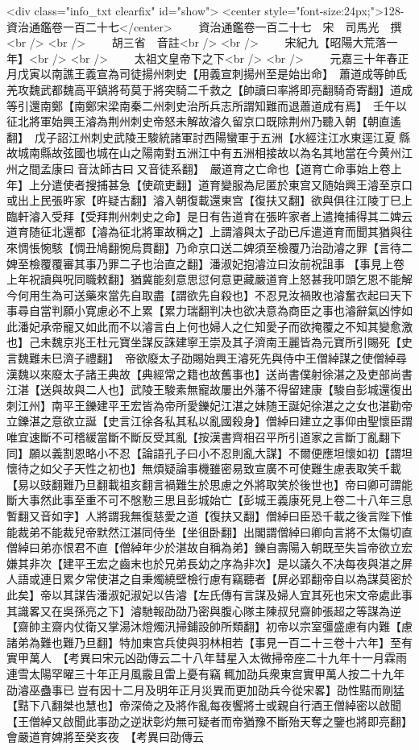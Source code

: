 <div class="info_txt clearfix" id="show">
<center style="font-size:24px;">128-資治通鑑卷一百二十七</center>
  　　資治通鑑卷一百二十七　宋　司馬光　撰<br />
<br />
　　胡三省　音註<br />
<br />
　　宋紀九【昭陽大荒落一年】<br />
<br />
　　太祖文皇帝下之下<br />
<br />
　　元嘉三十年春正月戊寅以南譙王義宣為司徒揚州刺史【用義宣刺揚州至是始出命】　蕭道成等帥氐羌攻魏武都魏高平鎮將苟莫于將突騎二千救之【帥讀曰率將即亮翻騎奇寄翻】道成等引還南鄭【南鄭宋梁南秦二州刺史治所兵志所謂知難而退蕭道成有焉】　壬午以征北將軍始興王濬為荆州刺史帝怒未解故濬久留京口既除荆州乃聽入朝【朝直遙翻】　戊子詔江州刺史武陵王駿統諸軍討西陽蠻軍于五洲【水經注江水東逕江夏縣故城南縣故弦國也城在山之陽南對五洲江中有五洲相接故以為名其地當在今黄州江州之間孟康曰音汰師古曰又音徒系翻】　嚴道育之亡命也【道育亡命事始上卷上年】上分遣使者搜捕甚急【使疏吏翻】道育變服為尼匿於東宫又随始興王濬至京口或出上民張旿家【旿疑古翻】濬入朝復載還東宫【復扶又翻】欲與俱往江陵丁巳上臨軒濬入受拜【受拜荆州刺史之命】是日有告道育在張旿家者上遣掩捕得其二婢云道育随征北還都【濬為征北將軍故稱之】上謂濬與太子劭已斥遣道育而聞其猶與往來惆悵惋駭【惆丑鳩翻惋烏貫翻】乃命京口送二婢須至檢覆乃治劭濬之罪【言待二婢至檢覆覆審其事乃罪二子也治直之翻】潘淑妃抱濬泣曰汝前祝詛事【事見上卷上年祝讀與呪同職敕翻】猶冀能刻意思愆何意更藏嚴道育上怒甚我叩頭乞恩不能解今何用生為可送藥來當先自取盡【謂欲先自殺也】不忍見汝禍敗也濬奮衣起曰天下事尋自當判願小寛慮必不上累【累力瑞翻判决也欲决意為商臣之事也濬辭氣凶悖如此潘妃承帝寵又如此而不以濬言白上何也婦人之仁知愛子而欲掩覆之不知其變愈激也】己未魏京兆王杜元寶坐謀反誅建寧王崇及其子濟南王麗皆為元寶所引賜死【史言魏難未巳濟子禮翻】　帝欲廢太子劭賜始興王濬死先與侍中王僧綽謀之使僧綽尋漢魏以來廢太子諸王典故【典經常之籍也故舊事也】送尚書僕射徐湛之及吏部尚書江湛【送與故與二人也】武陵王駿素無寵故屢出外藩不得留建康【駿自彭城還復出刺江州】南平王鑠建平王宏皆為帝所愛鑠妃江湛之妹随王誕妃徐湛之之女也湛勸帝立鑠湛之意欲立誕【史言江徐各私其私以亂國殺身】僧綽曰建立之事仰由聖懷臣謂唯宜速斷不可稽緩當斷不斷反受其亂【按漢書齊相召平所引道家之言斷丁亂翻下同】願以義割恩略小不忍【論語孔子曰小不忍則亂大謀】不爾便應坦懷如初【謂坦懷待之如父子天性之初也】無煩疑論事機雖密易致宣廣不可使難生慮表取笑千載【易以豉翻難乃旦翻載祖亥翻言禍難生於思慮之外將取笑於後世也】帝曰卿可謂能斷大事然此事至重不可不慇懃三思且彭城始亡【彭城王義康死見上卷二十八年三息暫翻又音如字】人將謂我無復慈愛之道【復扶又翻】僧綽曰臣恐千載之後言陛下惟能裁弟不能裁兒帝默然江湛同侍坐【坐徂卧翻】出閣謂僧綽曰卿向言將不太傷切直僧綽曰弟亦恨君不直【僧綽年少於湛故自稱為弟】鑠自壽陽入朝既至失旨帝欲立宏嫌其非次【建平王宏之齒末也於兄弟長幼之序為非次】是以議久不决每夜與湛之屏人語或連日累夕常使湛之自秉燭繞壁檢行慮有竊聽者【屏必郢翻帝自以為謀莫密於此矣】帝以其謀告潘淑妃淑妃以告濬【左氏傳有言謀及婦人宜其死也宋文帝處此事其識畧又在吳孫亮之下】濬馳報劭劭乃密與腹心隊主陳叔兒齋帥張超之等謀為逆【齋帥主齋内仗衛又掌湯沐燈燭汛掃鋪設帥所類翻】初帝以宗室彊盛慮有内難【慮諸弟為難也難乃旦翻】特加東宫兵使與羽林相若【事見一百二十三卷十六年】至有實甲萬人　【考異曰宋元凶劭傳云二十八年彗星入太微掃帝座二十九年十一月霖雨連雪太陽罕曜三十年正月風霰且雷上憂有竊輒加劭兵衆東宫實甲萬人按二十九年劭濬巫蠱事已豈有因十二月及明年正月災異而更加劭兵今從宋畧】劭性黠而剛猛【黠下八翻桀也慧也】帝深倚之及將作亂每夜饗將士或親自行酒王僧綽密以啟聞【王僧綽又啟聞此事劭之逆狀彰灼無可疑者而帝猶豫不斷殆天奪之鑒也將即亮翻】會嚴道育婢將至癸亥夜　【考異曰劭傳云